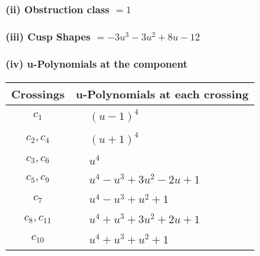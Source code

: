 \documentclass[1p]{elsarticle_modified}
\theoremstyle{definition}
\begin{document}
\flushleft \textbf{(ii) Obstruction class $= 1$}\\~\\
\flushleft \textbf{(iii) Cusp Shapes $= -3 u^3-3 u^2+8 u-12$}\\~\\
\newpage\renewcommand{\arraystretch}{1}
\flushleft \textbf{(iv) u-Polynomials at the component}\newline \\
\begin{tabular}{m{50pt}|m{274pt}}
Crossings & \hspace{64pt}u-Polynomials at each crossing \\
\hline $$\begin{aligned}c_{1}\end{aligned}$$&$\begin{aligned}
&(u-1)^4
\end{aligned}$\\
\hline $$\begin{aligned}c_{2},c_{4}\end{aligned}$$&$\begin{aligned}
&(u+1)^4
\end{aligned}$\\
\hline $$\begin{aligned}c_{3},c_{6}\end{aligned}$$&$\begin{aligned}
&u^4
\end{aligned}$\\
\hline $$\begin{aligned}c_{5},c_{9}\end{aligned}$$&$\begin{aligned}
&u^4- u^3+3 u^2-2 u+1
\end{aligned}$\\
\hline $$\begin{aligned}c_{7}\end{aligned}$$&$\begin{aligned}
&u^4- u^3+u^2+1
\end{aligned}$\\
\hline $$\begin{aligned}c_{8},c_{11}\end{aligned}$$&$\begin{aligned}
&u^4+u^3+3 u^2+2 u+1
\end{aligned}$\\
\hline $$\begin{aligned}c_{10}\end{aligned}$$&$\begin{aligned}
&u^4+u^3+u^2+1
\end{aligned}$\\
\hline
\end{tabular}\\~\\
\end{document}
